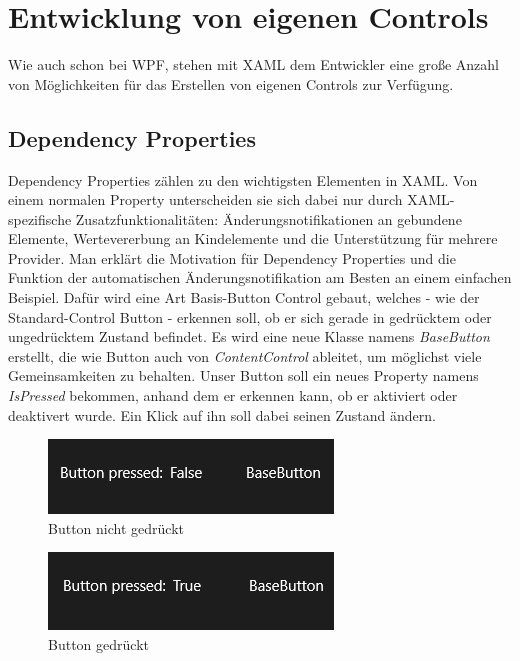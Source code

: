 \documentclass[a4paper,bibtotoc,oneside]{scrbook}
\begin{document}
\section[Entwicklung von eigenen Controls]{Entwicklung von eigenen Controls}
Wie auch schon bei WPF, stehen mit XAML dem Entwickler eine große Anzahl von Möglichkeiten für das Erstellen von eigenen Controls zur Verfügung.
\subsection[Dependency Properties]{Dependency Properties}\label{ref:dependencyprops}
Dependency Properties zählen zu den wichtigsten Elementen in XAML. Von einem normalen Property unterscheiden sie sich dabei nur durch XAML-spezifische Zusatzfunktionalitäten: Änderungsnotifikationen an gebundene Elemente, Wertevererbung an Kindelemente und die Unterstützung für mehrere Provider. 
Man erklärt die Motivation für Dependency Properties und die Funktion der automatischen Änderungsnotifikation am Besten an einem einfachen Beispiel.
\newline
\newline
Dafür wird eine Art Basis-Button Control gebaut, welches - wie der Standard-Control Button - erkennen soll, ob er sich gerade in gedrücktem oder ungedrücktem Zustand befindet. Es wird eine neue Klasse namens \textit{BaseButton} erstellt, die wie Button auch von \textit{ContentControl} ableitet, um möglichst viele Gemeinsamkeiten zu behalten. Unser Button soll ein neues Property namens \textit{IsPressed} bekommen, anhand dem er erkennen kann, ob er aktiviert oder deaktivert wurde. Ein Klick auf ihn soll dabei seinen Zustand ändern.
\newline
\newline
\begin{figure}[htbp]
\centering
\includegraphics[scale=1]{images/buttonpressed_false.png}
\caption[Button nicht gedrückt]{Button nicht gedrückt}\label{Abb5}
\end{figure}
\newline
\newline
\begin{figure}[htbp]
\centering
\includegraphics[scale=1]{images/buttonpressed_true.png}
\caption[Button gedrückt]{Button gedrückt}\label{Abb6}
\end{figure}
\end{document}
